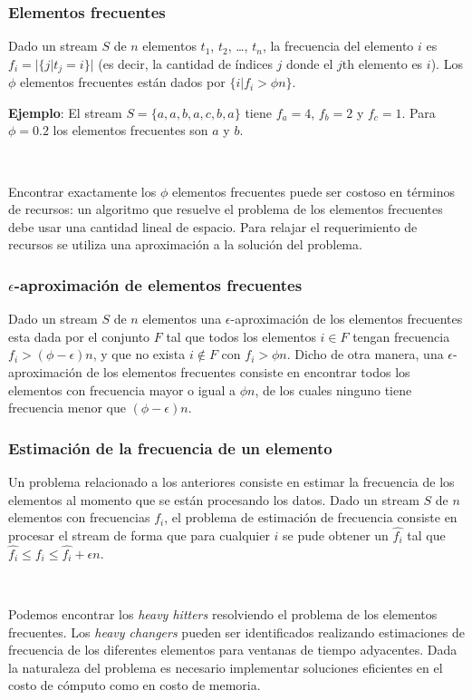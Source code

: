 \documentclass[a4paper,10pt, oneside]{article}
\begin{document}
\subsubsection*{Elementos frecuentes} Dado un stream $S$ de $n$ elementos $t_1$, $t_2$, \dots, $t_n$, la frecuencia del elemento $i$ es $f_i = |\{j|t_j=i\}|$ (es decir, la cantidad de índices $j$ donde el $j$th elemento es $i$). Los $\phi$ elementos frecuentes están dados por $\{i|f_i>\phi n\}$.

\textbf{Ejemplo}: El stream $S=\{a,a,b,a,c,b,a\}$ tiene $f_a=4$, $f_b=2$ y $f_c=1$. Para $\phi=0.2$ los elementos frecuentes son $a$ y $b$.

\

Encontrar exactamente los $\phi$ elementos frecuentes puede ser costoso en términos de recursos: un algoritmo que resuelve el problema de los elementos frecuentes debe usar una cantidad lineal de espacio\cite{Cormode:2010:MFF:1731351.1731356}. Para relajar el requerimiento de recursos se utiliza una aproximación a la solución del problema.

\subsubsection*{$\epsilon$-aproximación de elementos frecuentes} 
Dado un stream $S$ de $n$ elementos una $\epsilon$-aproximación de los elementos frecuentes esta dada por el conjunto $F$ tal que todos los elementos $i \in F$ tengan frecuencia $f_i > (\phi - \epsilon)n$, y que no exista $i \notin F$ con $f_i > \phi n$. Dicho de otra manera, una $\epsilon$-aproximación de los elementos frecuentes consiste en encontrar todos los elementos con frecuencia mayor o igual a $\phi n$, de los cuales ninguno tiene frecuencia menor que $(\phi - \epsilon) n$.

\subsubsection*{Estimación de la frecuencia de un elemento}
Un problema relacionado a los anteriores consiste en estimar la frecuencia de los elementos al momento que se están procesando los datos. Dado un stream $S$ de $n$ elementos con frecuencias $f_i$, el problema de estimación de frecuencia consiste en procesar el stream de forma que para cualquier $i$ se pude obtener un $\hat{f_i}$ tal que $\hat{f_i} \leq f_i \leq \hat{f_i}+\epsilon n$.

\

Podemos encontrar los \textit{heavy hitters} resolviendo el problema de los elementos frecuentes. Los \textit{heavy changers} pueden ser identificados realizando estimaciones de frecuencia de los diferentes elementos para ventanas de tiempo adyacentes. Dada la naturaleza del problema es necesario implementar soluciones eficientes en el costo de cómputo como en costo de memoria.
\end{document}
